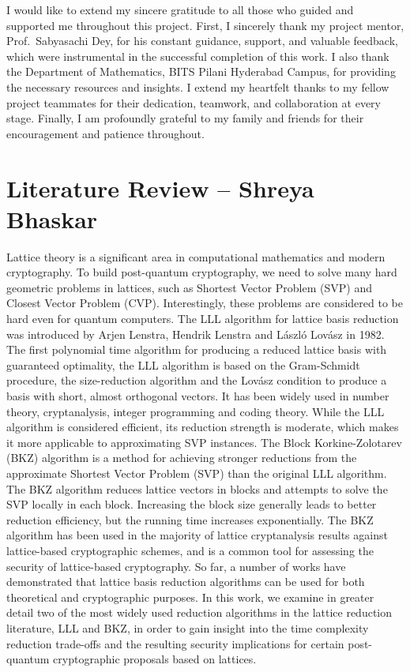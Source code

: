 \documentclass[12pt, a4paper]{article}
\theoremstyle{definition}
\theoremstyle{plain}
\begin{document}
I would like to extend my sincere gratitude to all those who guided and supported me throughout this project. First, I sincerely thank my project mentor,
Prof.\ Sabyasachi Dey, for his constant guidance, support, and valuable feedback, which were instrumental in the successful completion of this work. I also thank the Department of Mathematics, BITS Pilani Hyderabad Campus, for providing the necessary resources and insights. I extend my heartfelt thanks to my fellow project teammates
for their dedication, teamwork, and collaboration at every stage. Finally, I am profoundly grateful to my family and friends for their encouragement and patience throughout.

\newpage
\tableofcontents
\newpage

\section{Literature Review -- Shreya Bhaskar}

Lattice theory is a significant area in computational mathematics and modern cryptography. To build post-quantum cryptography, we need to solve many hard geometric problems in lattices, such as Shortest Vector Problem (SVP) and Closest Vector Problem (CVP). Interestingly, these problems are considered to be hard even for quantum computers.
The LLL algorithm for lattice basis reduction was introduced by Arjen Lenstra, Hendrik Lenstra and László Lovász in 1982. The first polynomial time algorithm for producing a reduced lattice basis with guaranteed optimality, the LLL algorithm is based on the Gram-Schmidt procedure, the size-reduction algorithm and the Lovász condition to produce a basis with short, almost orthogonal vectors. It has been widely used in number theory, cryptanalysis, integer programming and coding theory. While the LLL algorithm is considered efficient, its reduction strength is moderate, which makes it more applicable to approximating SVP instances.
The Block Korkine-Zolotarev (BKZ) algorithm is a method for achieving stronger reductions from the approximate Shortest Vector Problem (SVP) than the original LLL algorithm. The BKZ algorithm reduces lattice vectors in blocks and attempts to solve the SVP locally in each block. Increasing the block size generally leads to better reduction efficiency, but the running time increases exponentially. The BKZ algorithm has been used in the majority of lattice cryptanalysis results against lattice-based cryptographic schemes, and is a common tool for assessing the security of lattice-based cryptography.
So far, a number of works have demonstrated that lattice basis reduction algorithms can be used for both theoretical and cryptographic purposes. In this work, we examine in greater detail two of the most widely used reduction algorithms in the lattice reduction literature, LLL and BKZ, in order to gain insight into the time complexity reduction trade-offs and the resulting security implications for certain post-quantum cryptographic proposals based on lattices.
\end{document}
